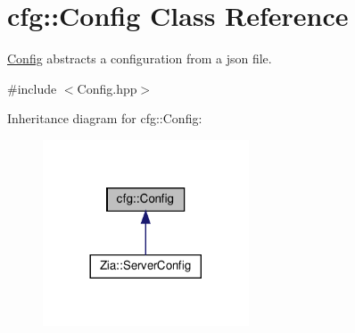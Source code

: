 \hypertarget{classcfg_1_1_config}{}\section{cfg\+:\+:Config Class Reference}
\label{classcfg_1_1_config}


\hyperlink{classcfg_1_1_config}{Config} abstracts a configuration from a json file.  




{\ttfamily \#include $<$Config.\+hpp$>$}



Inheritance diagram for cfg\+:\+:Config\+:\nopagebreak
\begin{figure}[H]
\begin{center}
\leavevmode
\includegraphics[width=173pt]{classcfg_1_1_config__inherit__graph}
\end{center}
\end{figure}
